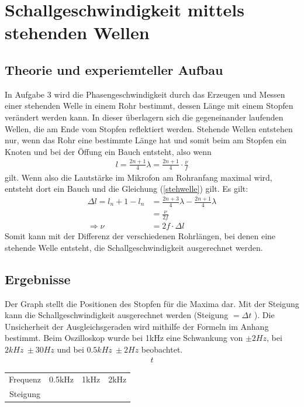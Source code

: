 \documentclass[11pt, a4paper]{article}
\begin{document}
    \section{Schallgeschwindigkeit mittels stehenden Wellen}

    \subsection{Theorie und experiemteller Aufbau}
    In Aufgabe 3 wird die Phasengeschwindigkeit durch das Erzeugen und Messen 
    einer stehenden Welle in einem Rohr bestimmt, dessen Länge mit einem Stopfen verändert werden kann.
    In dieser überlagern sich die gegeneinander laufenden Wellen,
    die  am Ende vom Stopfen reflektiert werden. Stehende Wellen entstehen nur, wenn das Rohr eine bestimmte Länge hat
    und somit beim am Stopfen ein Knoten und bei der Öffung ein Bauch entsteht, also wenn
    \begin{align} \label{stehwelle}
        l = \frac{2n+1}{4} \lambda = \frac{2n + 1}{4} \cdot \frac{\nu}{f}
    \end{align}
    gilt. Wenn also die Lautstärke im Mikrofon am Rohranfang maximal wird, entsteht dort ein Bauch und die Gleichung
    (\ref{stehwelle}) gilt. Es gilt: 
    \begin{align}
        \Delta l = l_n+1 - l_n &= \frac{2n+3}{4} \lambda - \frac{2n+1}{4} \lambda \nonumber \\
        &= \frac{\nu}{2f} \nonumber \\
         \Rightarrow \nu &= 2f \cdot \Delta l
    \end{align}
    Somit kann mit der Differenz der verschiedenen Rohrlängen, bei denen eine stehende Welle 
    entsteht, die Schallgeschwindigkeit ausgerechnet werden.

    \subsection{Ergebnisse}
    Der Graph stellt die Positionen des Stopfen für die Maxima dar. Mit der Steigung kann die Schallgeschwindigkeit
    ausgerechnet werden (Steigung $= \Delta t$ ). Die Unsicherheit der Ausgleichsgeraden wird mithilfe der Formeln im Anhang bestimmt.
    Beim Oszilloskop wurde bei 1kHz eine Schwankung von $\pm 2Hz$, bei $ 2kHz \ \pm 30Hz$ und bei $0.5kHz \ \pm 2Hz $ beobachtet.
    \begin{align}
        t
    \end{align}


    \begin{table}
        \centering
        \begin{tabular}[]{c|c|c|c}
            Frequenz & 0.5kHz & 1kHz & 2kHz \\
            Steigung & 


        \end{tabular}
    \end{table}
\end{document}

